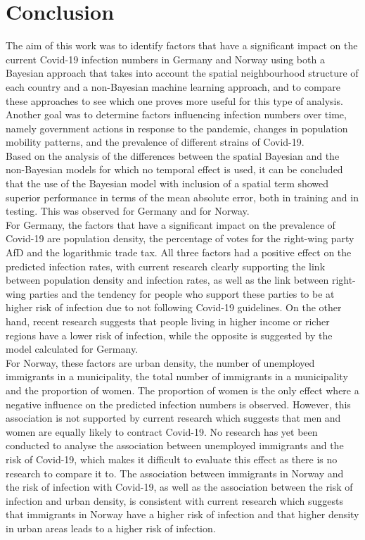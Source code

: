 %
\chapter{Conclusion}\label{sec:conclussion}
The aim of this work was to identify factors that have a significant impact on the current Covid-19 infection numbers in Germany and Norway using both a Bayesian approach that takes into account the spatial neighbourhood structure of each country and a non-Bayesian machine learning approach, and to compare these approaches to see which one proves more useful for this type of analysis. Another goal was to determine factors influencing infection numbers over time, namely government actions in response to the pandemic, changes in population mobility patterns, and the prevalence of different strains of Covid-19. \\
Based on the analysis of the differences between the spatial Bayesian and the non-Bayesian models for which no temporal effect is used, it can be concluded that the use of the Bayesian model with inclusion of a spatial term showed superior performance in terms of the mean absolute error, both in training and in testing. This was observed for Germany and for Norway. \\
For Germany, the factors that have a significant impact on the prevalence of Covid-19 are population density, the percentage of votes for the right-wing party AfD and the logarithmic trade tax. All three factors had a positive effect on the predicted infection rates, with current research clearly supporting the link between population density and infection rates, as well as the link between right-wing parties and the tendency for people who support these parties to be at higher risk of infection due to not following Covid-19 guidelines. On the other hand, recent research suggests that people living in higher income or richer regions have a lower risk of infection, while the opposite is suggested by the model calculated for Germany. \\
For Norway, these factors are urban density, the number of unemployed immigrants in a municipality, the total number of immigrants in a municipality and the proportion of women. The proportion of women is the only effect where a negative influence on the predicted infection numbers is observed. However, this association is not supported by current research which suggests that men and women are equally likely to contract Covid-19. No research has yet been conducted to analyse the association between unemployed immigrants and the risk of Covid-19, which makes it difficult to evaluate this effect as there is no research to compare it to. The association between immigrants in Norway and the risk of infection with Covid-19, as well as the association between the risk of infection and urban density, is consistent with current research which suggests that immigrants in Norway have a higher risk of infection and that higher density in urban areas leads to a higher risk of infection. \\

